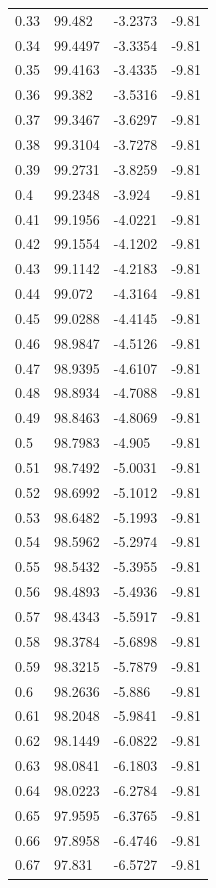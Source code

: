 \begin{tabular}{llll}
0.33 & 99.482 & -3.2373 & -9.81 \\
0.34 & 99.4497 & -3.3354 & -9.81 \\
0.35 & 99.4163 & -3.4335 & -9.81 \\
0.36 & 99.382 & -3.5316 & -9.81 \\
0.37 & 99.3467 & -3.6297 & -9.81 \\
0.38 & 99.3104 & -3.7278 & -9.81 \\
0.39 & 99.2731 & -3.8259 & -9.81 \\
0.4 & 99.2348 & -3.924 & -9.81 \\
0.41 & 99.1956 & -4.0221 & -9.81 \\
0.42 & 99.1554 & -4.1202 & -9.81 \\
0.43 & 99.1142 & -4.2183 & -9.81 \\
0.44 & 99.072 & -4.3164 & -9.81 \\
0.45 & 99.0288 & -4.4145 & -9.81 \\
0.46 & 98.9847 & -4.5126 & -9.81 \\
0.47 & 98.9395 & -4.6107 & -9.81 \\
0.48 & 98.8934 & -4.7088 & -9.81 \\
0.49 & 98.8463 & -4.8069 & -9.81 \\
0.5 & 98.7983 & -4.905 & -9.81 \\
0.51 & 98.7492 & -5.0031 & -9.81 \\
0.52 & 98.6992 & -5.1012 & -9.81 \\
0.53 & 98.6482 & -5.1993 & -9.81 \\
0.54 & 98.5962 & -5.2974 & -9.81 \\
0.55 & 98.5432 & -5.3955 & -9.81 \\
0.56 & 98.4893 & -5.4936 & -9.81 \\
0.57 & 98.4343 & -5.5917 & -9.81 \\
0.58 & 98.3784 & -5.6898 & -9.81 \\
0.59 & 98.3215 & -5.7879 & -9.81 \\
0.6 & 98.2636 & -5.886 & -9.81 \\
0.61 & 98.2048 & -5.9841 & -9.81 \\
0.62 & 98.1449 & -6.0822 & -9.81 \\
0.63 & 98.0841 & -6.1803 & -9.81 \\
0.64 & 98.0223 & -6.2784 & -9.81 \\
0.65 & 97.9595 & -6.3765 & -9.81 \\
0.66 & 97.8958 & -6.4746 & -9.81 \\
0.67 & 97.831 & -6.5727 & -9.81 \\

\end{tabular}
